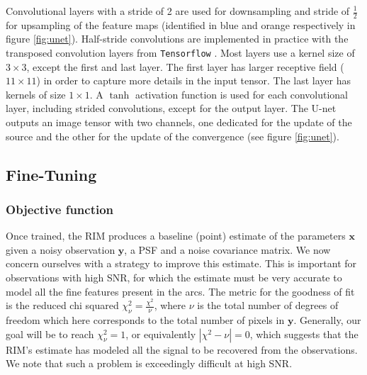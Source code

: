 Convolutional layers with a stride of 2 are used for downsampling and 
stride of $\frac{1}{2}$ for upsampling of the feature maps
(identified in blue and orange respectively in figure \ref{fig:unet}). Half-stride convolutions are implemented in practice with the transposed convolution layers from \texttt{Tensorflow} \citep{tensorflow}.
Most layers use a kernel size of $3\times3$, except the first and last layer. 
The first layer has 
larger receptive field ($11\times11$) in order to capture more details in the input tensor. 
The last layer has kernels of size $1\times 1$. 
A $\tanh$ 
activation function is used 
for each convolutional layer, including strided convolutions, except for the output 
layer. The U-net outputs an image tensor with two channels, one dedicated for the update of the source 
and the other for the update of the convergence (see figure \ref{fig:unet}). 





\subsection{Fine-Tuning}\label{sec:fine-tuning}

\subsubsection{Objective function}
Once trained, the RIM produces a baseline (point)
estimate of the parameters $\mathbf{x}$ given a noisy observation $\mathbf{y}$, a PSF and a noise covariance matrix. 
We now concern ourselves with a strategy to improve 
this estimate. 
This is important 
for observations with high SNR, for which the estimate
must be very accurate to model all the fine features present in the arcs.
The metric for the goodness of fit 
is the reduced chi squared $\chi^2_\nu = \frac{\chi^2}{\nu}$, 
where $\nu$ is the total number of degrees of freedom which here corresponds to 
the total number of pixels in $\mathbf{y}$.
Generally, our goal will be to reach $\chi^2_\nu = 1$, or equivalently $|\chi^2 - \nu| = 0$, 
which suggests that the RIM's estimate has modeled all the signal 
to be recovered from the observations. 
We note that such a problem is exceedingly  
difficult at high SNR. 

